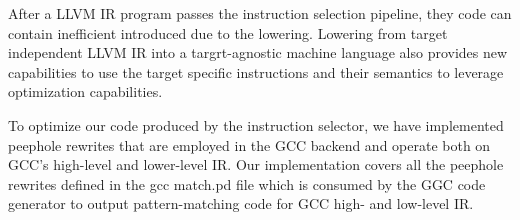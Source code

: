 After a LLVM IR program passes the instruction selection pipeline, they code can contain inefficient introduced due to the lowering. Lowering from target independent LLVM IR into a targrt-agnostic machine language also provides new capabilities to use the target specific instructions and their semantics to leverage optimization capabilities. 

To optimize our code produced by the instruction selector, we have implemented peephole rewrites that are employed in the GCC backend and operate both on GCC's high-level and lower-level IR. Our implementation covers all the peephole rewrites defined in the gcc match.pd file which is consumed by the GGC code generator to output pattern-matching code for GCC high- and low-level IR. 












